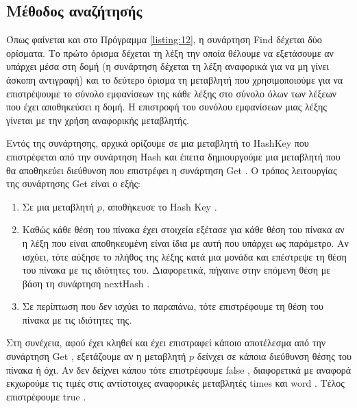 \subsection{Μέθοδος αναζήτησής}

Όπως φαίνεται και στο Πρόγραμμα \ref{listing:12}, η συνάρτηση \en Find \gr δέχεται δύο ορίσματα. Το πρώτο όρισμα δέχεται τη λέξη την οποία θέλουμε να εξετάσουμε αν υπάρχει μέσα στη δομή (η συνάρτηση δέχεται τη λέξη αναφορικά για να μη γίνει άσκοπη αντιγραφή) και το δεύτερο όρισμα τη μεταβλητή που χρησιμοποιούμε για να επιστρέψουμε το σύνολο εμφανίσεων της κάθε λέξης στο σύνολο όλων των λέξεων που έχει αποθηκεύσει η δομή. Η επιστροφή του συνόλου εμφανίσεων μιας λέξης γίνεται με την χρήση αναφορικής μεταβλητής.

Εντός της συνάρτησης, αρχικά ορίζουμε σε μια μεταβλητή το \en HashKey \gr που επιστρέφεται από την συνάρτηση \en Hash \gr και έπειτα δημιουργούμε μια μεταβλητή που θα αποθηκεύει διεύθυνση που επιστρέφει η συνάρτηση \en Get \gr. Ο τρόπος λειτουργίας της συνάρτησης \en Get \gr είναι ο εξής:

\begin{enumerate}
    \item Σε μια μεταβλητή $p$, αποθήκευσε το \en Hash Key \gr.
    \item Καθώς κάθε θέση του πίνακα έχει στοιχεία εξέτασε για κάθε θέση του πίνακα αν η λέξη που είναι αποθηκευμένη είναι ίδια με αυτή που υπάρχει ως παράμετρο. Αν ισχύει, τότε αύξησε το πλήθος της λέξης κατά μια μονάδα και επέστρεψε τη θέση του πίνακα με τις ιδιότητες του. Διαφορετικά, πήγαινε στην επόμενη θέση με βάση τη συνάρτηση \en nextHash \gr.
    \item Σε περίπτωση που δεν ισχύει το παραπάνω, τότε επιστρέφουμε τη θέση του πίνακα με τις ιδιότητες της.
\end{enumerate}

Στη συνέχεια, αφού έχει κληθεί και έχει επιστραφεί κάποιο αποτέλεσμα από την συνάρτηση \en Get \gr, εξετάζουμε αν η μεταβλητή $p$ δείνχει σε κάποια διεύθυνση θέσης του πίνακα ή όχι. Αν δεν δείχνει κάπου τότε επιστρέφουμε \en false \gr, διαφορετικά με αναφορά εκχωρούμε τις τιμές στις αντίστοιχες αναφορικές μεταβλητές \en times \gr και \en word \gr. Τέλος επιστρέφουμε \en true \gr.

